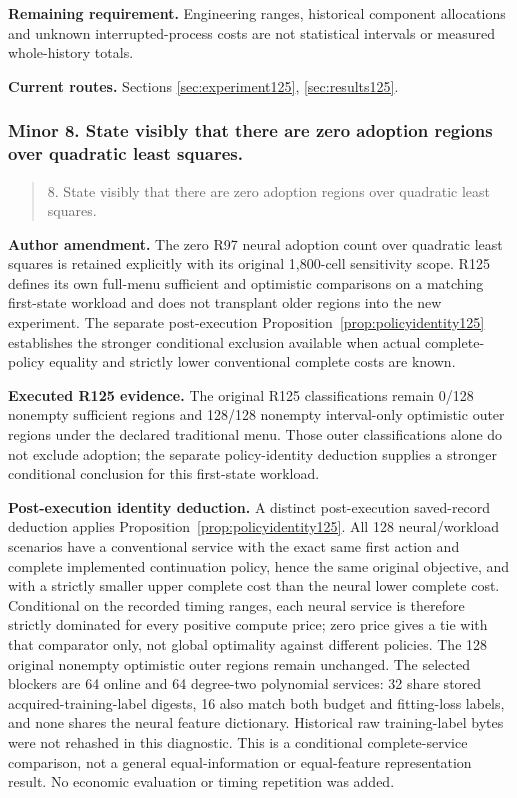 \noindent\textbf{Remaining requirement.} Engineering ranges, historical component allocations and unknown interrupted-process costs are not statistical intervals or measured whole-history totals.

\noindent\textbf{Current routes.} Sections \ref{sec:experiment125}, \ref{sec:results125}.

\subsubsection{Minor 8. State visibly that there are zero adoption regions over quadratic least squares.}

\begin{quote}\small
8. State visibly that there are zero adoption regions over quadratic least squares.
\end{quote}

\noindent\textbf{Author amendment.} The zero R97 neural adoption count over quadratic least squares is retained explicitly with its original 1,800-cell sensitivity scope. R125 defines its own full-menu sufficient and optimistic comparisons on a matching first-state workload and does not transplant older regions into the new experiment. The separate post-execution Proposition~\ref{prop:policyidentity125} establishes the stronger conditional exclusion available when actual complete-policy equality and strictly lower conventional complete costs are known.

\noindent\textbf{Executed R125 evidence.} The original R125 classifications remain 0/128 nonempty sufficient regions and 128/128 nonempty interval-only optimistic outer regions under the declared traditional menu. Those outer classifications alone do not exclude adoption; the separate policy-identity deduction supplies a stronger conditional conclusion for this first-state workload.

\noindent\textbf{Post-execution identity deduction.} A distinct post-execution saved-record deduction applies Proposition~\ref{prop:policyidentity125}. All 128 neural/workload scenarios have a conventional service with the exact same first action and complete implemented continuation policy, hence the same original objective, and with a strictly smaller upper complete cost than the neural lower complete cost. Conditional on the recorded timing ranges, each neural service is therefore strictly dominated for every positive compute price; zero price gives a tie with that comparator only, not global optimality against different policies. The 128 original nonempty optimistic outer regions remain unchanged. The selected blockers are 64 online and 64 degree-two polynomial services: 32 share stored acquired-training-label digests, 16 also match both budget and fitting-loss labels, and none shares the neural feature dictionary. Historical raw training-label bytes were not rehashed in this diagnostic. This is a conditional complete-service comparison, not a general equal-information or equal-feature representation result. No economic evaluation or timing repetition was added.

